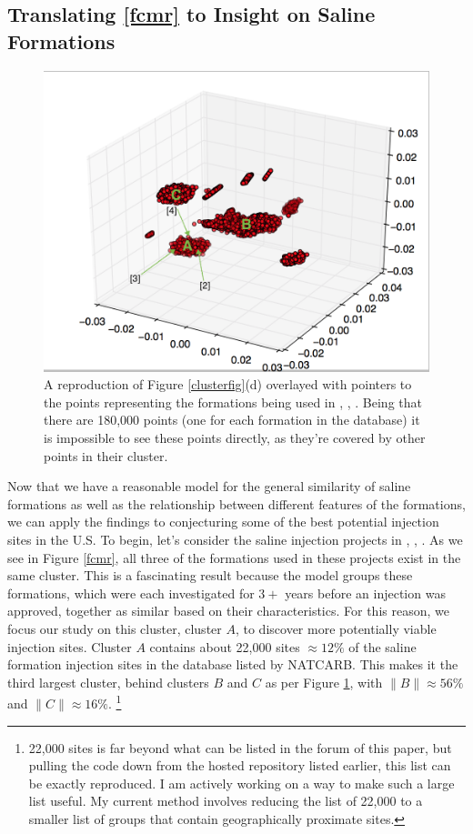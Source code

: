 \documentclass[letterpaper, 12pt]{article}
\begin{document}
\subsection{Translating \ref{fcmr} to Insight on Saline Formations} 
\begin{figure}
\centering
\includegraphics[width=.65\linewidth]{k9disc}
\caption{\label{k99disc} A reproduction of Figure \ref{clusterfig}(d) overlayed with pointers to the points representing the formations being used in \cite{midwestinject}, \cite{midwestinject2}, \cite{southeastinject}. Being that there are 180,000 points (one for each formation in the database) it is impossible to see these points directly, as they're covered by other points in their cluster.}
\end{figure}

\par Now that we have a reasonable model for the general similarity of saline formations as well as the relationship between different features of the formations, we can apply the findings to conjecturing some of the best potential injection sites in the U.S. To begin, let's consider the saline injection projects in \cite{midwestinject}, \cite{midwestinject2}, \cite{southeastinject}. As we see in Figure \ref{fcmr}, all three of the formations used in these projects exist in the same cluster. This is a fascinating result because the model groups these formations, which were each investigated for $3+$ years before an injection was approved, together as similar based on their characteristics. For this reason, we focus our study on this cluster, cluster $A$, to discover more potentially viable injection sites. Cluster $A$ contains about 22,000 sites $\approx 12\%$ of the saline formation injection sites in the database listed by NATCARB. This makes it the third largest cluster, behind clusters $B$ and $C$ as per Figure \ref{k99disc}, with $\|B\| \approx 56\%$ and $\|C\| \approx 16\%$. \footnote{22,000 sites is far beyond what can be listed in the forum of this paper, but pulling the code down from the hosted repository listed earlier, this list can be exactly reproduced. I am actively working on a way to make such a large list useful. My current method involves reducing the list of 22,000 to a smaller list of groups that contain geographically proximate sites.} 
\end{document}
